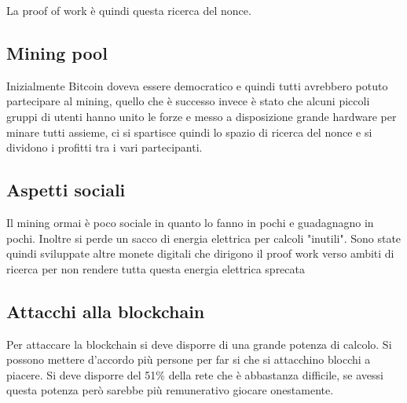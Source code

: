 La proof of work è quindi questa ricerca del nonce.

\subsection{Mining pool}
Inizialmente Bitcoin doveva essere democratico e quindi tutti avrebbero potuto partecipare al mining, quello che è successo invece è stato che alcuni piccoli gruppi di utenti hanno unito le forze e messo a disposizione grande hardware per minare tutti assieme, ci si spartisce quindi lo spazio di ricerca del nonce e si dividono i profitti tra i vari partecipanti.

\subsection{Aspetti sociali}
Il mining ormai è poco sociale in quanto lo fanno in pochi e guadagnagno in pochi.
Inoltre si perde un sacco di energia elettrica per calcoli "inutili".
Sono state quindi sviluppate altre monete digitali che dirigono il proof work verso ambiti di ricerca per non rendere tutta questa energia elettrica sprecata

\subsection{Attacchi alla blockchain}
Per attaccare la blockchain si deve disporre di una grande potenza di calcolo.
Si possono mettere d'accordo più persone per far si che si attacchino blocchi a piacere.
Si deve disporre del 51\% della rete che è abbastanza difficile, se avessi questa potenza però sarebbe più remunerativo giocare onestamente.












